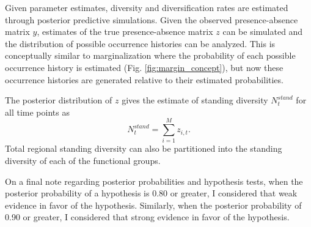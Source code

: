 \documentclass[12pt,letterpaper]{article}
\begin{document}


Given parameter estimates, diversity and diversification rates are estimated through posterior predictive simulations. Given the observed presence-absence matrix \(y\), estimates of the true presence-absence matrix \(z\) can be simulated and the distribution of possible occurrence histories can be analyzed. This is conceptually similar to marginalization where the probability of each possible occurrence history is estimated (Fig. \ref{fig:margin_concept}), but now these occurrence histories are generated relative to their estimated probabilities.

The posterior distribution of \(z\) gives the estimate of standing diversity \(N^{stand}_{t}\) for all time points as 
\begin{equation}
  N^{stand}_{t} = \sum_{i = 1}^{M} z_{i, t}.
  \label{eq:stand_est}
\end{equation}
Total regional standing diversity can also be partitioned into the standing diversity of each of the functional groups.


On a final note regarding posterior probabilities and hypothesis tests, when the posterior probability of a hypothesis is 0.80 or greater, I considered that weak evidence in favor of the hypothesis. Similarly, when the posterior probability of 0.90 or greater, I considered that strong evidence in favor of the hypothesis.
\end{document}
